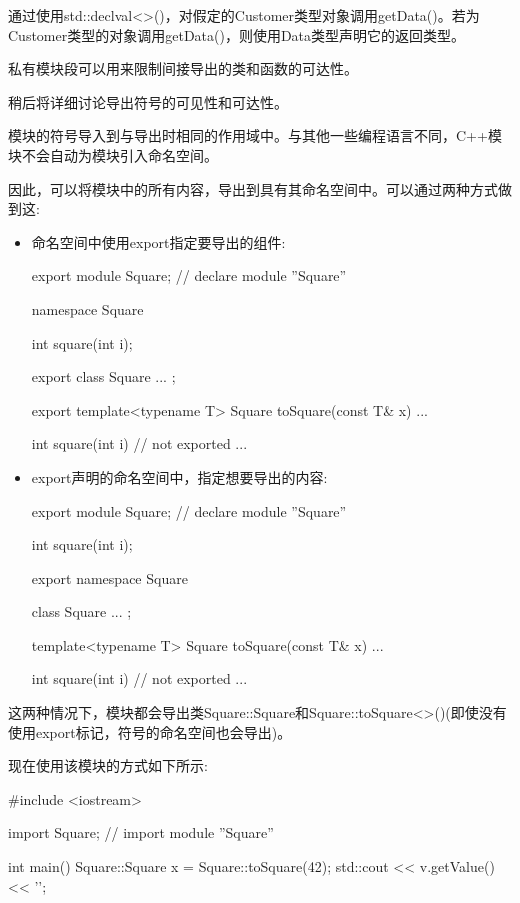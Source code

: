 通过使用std::declval<>()，对假定的Customer类型对象调用getData()。若为Customer类型的对象调用getData()，则使用Data类型声明它的返回类型。

私有模块段可以用来限制间接导出的类和函数的可达性。

稍后将详细讨论导出符号的可见性和可达性。


模块的符号导入到与导出时相同的作用域中。与其他一些编程语言不同，C++模块不会自动为模块引入命名空间。

因此，可以将模块中的所有内容，导出到具有其命名空间中。可以通过两种方式做到这:

\begin{itemize}
\item
命名空间中使用export指定要导出的组件:

\begin{cpp}
export module Square; // declare module ”Square”

namespace Square {
	int square(int i);

	export class Square {
		...
	};

	export template<typename T>
	Square toSquare(const T& x) {
		...
	}

	int square(int i) { // not exported
		...
	}
}
\end{cpp}

\item
export声明的命名空间中，指定想要导出的内容:

\begin{cpp}
export module Square; // declare module ”Square”

int square(int i);

export namespace Square {
	class Square {
		...
	};

	template<typename T>
	Square toSquare(const T& x) {
		...
	}
}

int square(int i) { // not exported
	...
}
\end{cpp}

\end{itemize}

这两种情况下，模块都会导出类Square::Square和Square::toSquare<>()(即使没有使用export标记，符号的命名空间也会导出)。

现在使用该模块的方式如下所示:

\begin{cpp}
#include <iostream>

import Square; // import module ”Square”

int main()
{
	Square::Square x = Square::toSquare(42);
	std::cout << v.getValue() << '\n';
}
\end{cpp}

